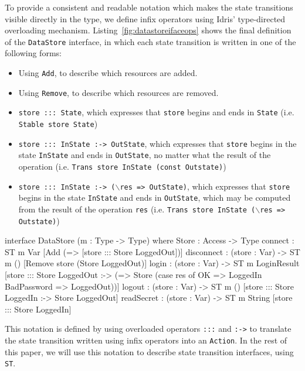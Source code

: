 To provide a consistent and readable notation which makes the state transitions
visible directly in the type, we define infix operators using Idris'
type-directed overloading mechanism.
Listing~\ref{fig:datastoreifaceops}
shows the final definition of the \texttt{DataStore} interface, in which
each state transition is written in one of the following forms:

\begin{itemize}
\item Using \texttt{Add}, to describe which resources are added.
\item Using \texttt{Remove}, to describe which resources are removed.
\item \texttt{store ::: State}, which expresses that \texttt{store} begins
and ends in \texttt{State} (i.e. \texttt{Stable store State})
\item \texttt{store ::: InState :-> OutState}, which expresses that
\texttt{store} begins in the state \texttt{InState} and ends in \texttt{OutState}, no
matter what the result of the operation 
(i.e. \texttt{Trans store InState (const Outstate)})
\item \texttt{store ::: InState :-> ($\backslash$res => OutState)}, which expresses
that \texttt{store} begins in the state \texttt{InState} and ends in \texttt{OutState},
which may be computed from the result of the operation \texttt{res}
(i.e. \texttt{Trans store InState ($\backslash$res => Outstate)})
\end{itemize}

\small
\begin{code}[float=h, frame=single,caption={An interface for the data
store, using \texttt{ST} to describe the state transitions in each
operation},label=fig:datastoreifaceops]
interface DataStore (m : Type -> Type) where
  Store : Access -> Type
  connect : ST m Var [Add (\store => [store ::: Store LoggedOut])]
  disconnect : (store : Var) -> ST m () [Remove store (Store LoggedOut)]
  login : (store : Var) ->
        ST m LoginResult [store ::: Store LoggedOut :->
                           (\res => Store (case res of
                                                OK => LoggedIn
                                                BadPassword => LoggedOut))]
  logout : (store : Var) -> ST m () [store ::: Store LoggedIn :-> Store LoggedOut]
  readSecret : (store : Var) -> ST m String [store ::: Store LoggedIn]
\end{code}
\normalsize

This notation is defined by using overloaded operators \texttt{:::} and
\texttt{:->} to translate the state transition written using infix operators
into an \texttt{Action}. 
In the rest of this paper, we will use this
notation to describe state transition interfaces, using \texttt{ST}.

